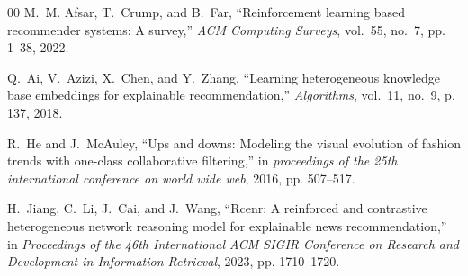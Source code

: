 \documentclass[10pt,journal,compsoc]{IEEEtran}
\begin{document}
\begin{thebibliography}{00}
M.~M. Afsar, T.~Crump, and B.~Far, ``Reinforcement learning based recommender systems: A survey,'' \emph{ACM Computing Surveys}, vol.~55, no.~7, pp. 1--38, 2022.

Q.~Ai, V.~Azizi, X.~Chen, and Y.~Zhang, ``Learning heterogeneous knowledge base embeddings for explainable recommendation,'' \emph{Algorithms}, vol.~11, no.~9, p. 137, 2018.

R.~He and J.~McAuley, ``Ups and downs: Modeling the visual evolution of fashion trends with one-class collaborative filtering,'' in \emph{proceedings of the 25th international conference on world wide web}, 2016, pp. 507--517.

H.~Jiang, C.~Li, J.~Cai, and J.~Wang, ``Rcenr: A reinforced and contrastive heterogeneous network reasoning model for explainable news recommendation,'' in \emph{Proceedings of the 46th International ACM SIGIR Conference on Research and Development in Information Retrieval}, 2023, pp. 1710--1720.


\end{thebibliography}


 

\end{document}
